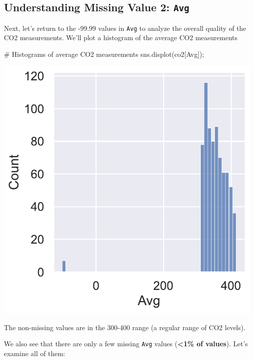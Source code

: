 \documentclass[
  letterpaper,
  DIV=11,
  numbers=noendperiod]{scrreprt}
\newenvironment{Shaded}{\begin{snugshade}}{\end{snugshade}}
\newcommand{\CommentTok}[1]{\textcolor[rgb]{0.37,0.37,0.37}{#1}}
\newcommand{\NormalTok}[1]{\textcolor[rgb]{0.00,0.23,0.31}{#1}}
\newcommand{\OperatorTok}[1]{\textcolor[rgb]{0.37,0.37,0.37}{#1}}
\newcommand{\StringTok}[1]{\textcolor[rgb]{0.13,0.47,0.30}{#1}}
\begin{document}
\subsection{\texorpdfstring{Understanding Missing Value 2:
\texttt{Avg}}{Understanding Missing Value 2: Avg}}\label{understanding-missing-value-2-avg}

Next, let's return to the -99.99 values in \texttt{Avg} to analyze the
overall quality of the CO2 measurements. We'll plot a histogram of the
average CO2 measurements

\begin{Shaded}
\begin{Highlighting}[]
\CommentTok{\# Histograms of average CO2 measurements}
\NormalTok{sns.displot(co2[}\StringTok{\textquotesingle{}Avg\textquotesingle{}}\NormalTok{])}\OperatorTok{;}
\end{Highlighting}
\end{Shaded}

\includegraphics{eda/eda_files/figure-pdf/cell-69-output-1.pdf}

The non-missing values are in the 300-400 range (a regular range of CO2
levels).

We also see that there are only a few missing \texttt{Avg} values
(\textbf{\textless1\% of values}). Let's examine all of them:
\end{document}
